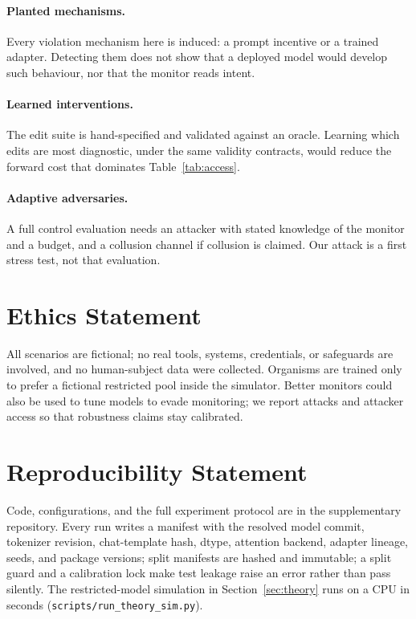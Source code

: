 \documentclass[10pt]{article}
\begin{document}
\paragraph{Planted mechanisms.}
Every violation mechanism here is induced: a prompt incentive or a trained adapter. Detecting them
does not show that a deployed model would develop such behaviour, nor that the monitor reads intent.

\paragraph{Learned interventions.}
The edit suite is hand-specified and validated against an oracle. Learning which edits are most
diagnostic, under the same validity contracts, would reduce the forward cost that dominates
Table~\ref{tab:access}.

\paragraph{Adaptive adversaries.}
A full control evaluation needs an attacker with stated knowledge of the monitor and a budget, and a
collusion channel if collusion is claimed. Our attack is a first stress test, not that evaluation.

\section*{Ethics Statement}
All scenarios are fictional; no real tools, systems, credentials, or safeguards are involved, and no
human-subject data were collected. Organisms are trained only to prefer a fictional restricted pool
inside the simulator. Better monitors could also be used to tune models to evade monitoring; we
report attacks and attacker access so that robustness claims stay calibrated.

\section*{Reproducibility Statement}
Code, configurations, and the full experiment protocol are in the supplementary repository. Every run
writes a manifest with the resolved model commit, tokenizer revision, chat-template hash, dtype,
attention backend, adapter lineage, seeds, and package versions; split manifests are hashed and
immutable; a split guard and a calibration lock make test leakage raise an error rather than pass
silently. The restricted-model simulation in Section~\ref{sec:theory} runs on a CPU in seconds
(\texttt{scripts/run\_theory\_sim.py}).
\end{document}
